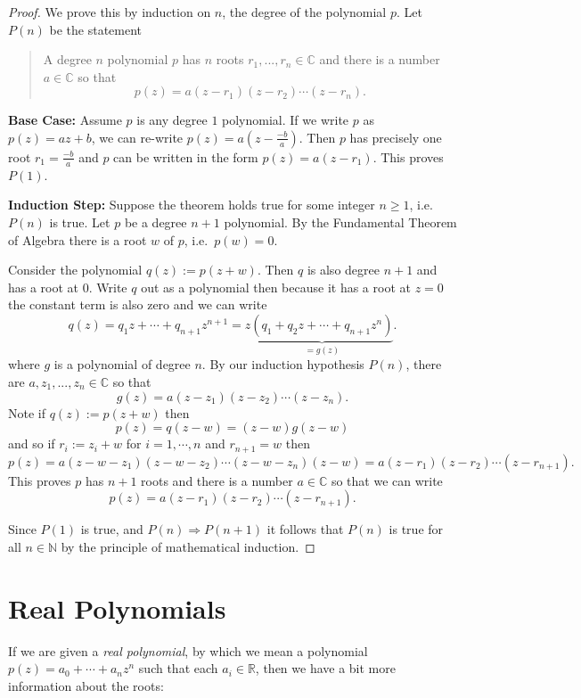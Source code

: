 \documentclass[11pt,dvipsnames]{book}
\numberwithin{figure}{section} %
\numberwithin{table}{section} %
\begin{document}
\begin{proof}
We prove this by induction on \(n\), the degree of the polynomial \(p\).
Let \(P(n)\) be the statement
\begin{quote}
A degree $n$ polynomial \(p\) has $n$ roots $r_{1},...,r_{n}\in\mathbb{C}$ and there is a number $a\in\mathbb{C}$ so that
\[
p(z) = a(z-r_{1})(z-r_{2})\cdots (z-r_{n}).\]
\end{quote}

{\bf Base Case:} Assume \(p\) is any degree \(1\) polynomial.
If we write \(p\) as $p(z)=az+b$, we can re-write $p(z) = a(z-\frac{-b}{a})$.
Then \(p\) has precisely one root \(r_1=\frac{-b}{a}\) and \(p\) can be written in the form \(p(z)=a(z-r_1)\). This proves \(P(1)\).

{\bf Induction Step:}
Suppose the theorem holds true for some integer $n\geq 1$, i.e. \(P(n)\) is true.
Let $p$ be a degree $n+1$ polynomial.
By the Fundamental Theorem of Algebra there is a root $w$ of $p$, i.e.~\(p(w)=0\).

Consider the polynomial $q(z):=p(z+w)$.
Then \(q\) is also degree \(n+1\) and has a root at $0$.
Write \(q\) out as a polynomial then because it has a root at \(z=0\) the constant term is also zero and we can write
\[
q(z) = q_{1}z+\cdots + q_{n+1}z^{n+1}
= z\underbrace{(q_{1}+q_{2}z+\cdots + q_{n+1}z^{n})}_{=g(z)}.
\]
where \(g\) is a polynomial of degree \(n\).
By our induction hypothesis \(P(n)\), there are $a,z_{1},...,z_{n}\in\mathbb{C}$ so that
\[
g(z) = a(z-z_{1})(z-z_{2})\cdots (z-z_{n}).
\]
Note if \(q(z):=p(z+w)\) then
\[
p(z)=q(z-w)=(z-w)g(z-w)
\]
and so if \(r_{i}:=z_{i}+w\) for \(i=1,\cdots, n\) and \(r_{n+1}=w\)
then
\[
p(z) = a(z-w-z_{1})(z-w-z_{2})\cdots (z-w-z_{n})(z-w)
=a(z-r_{1})(z-r_{2})\cdots (z-r_{n+1}).
\]
This proves \(p\) has $n+1$ roots and there is a number $a\in\mathbb{C}$ so that we can write
\[
p(z) = a(z-r_{1})(z-r_{2})\cdots (z-r_{n+1}).\]

Since \(P(1)\) is true, and \(P(n)\Rightarrow P(n+1)\) it follows that \(P(n)\) is true for all \(n\in\mathbb{N}\) by the principle of mathematical induction.
\end{proof}

\section{Real Polynomials}%
\label{realpolynomials}

If we are given a {\it real polynomial}, by which we mean a polynomial $p(z)=a_{0}+\cdots + a_{n}z^{n}$ such that each $a_i \in \mathbb{R}$, then we have a bit more information about the roots:
\end{document}

